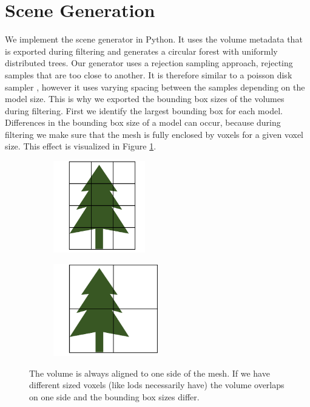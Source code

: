 \section{Scene Generation}
\label{sec:scene_generation}
We implement the scene generator in Python.
It uses the volume metadata that is exported during filtering and generates a circular forest with uniformly distributed trees.
Our generator uses a rejection sampling approach, rejecting samples that are too close to another.
It is therefore similar to a poisson disk sampler \cite{poisson_sampling}, however it uses varying spacing between the samples depending on the model size.
This is why we exported the bounding box sizes of the volumes during filtering.
First we identify the largest bounding box for each model.
Differences in the bounding box size of a model can occur, because during filtering we make sure that the mesh is fully enclosed by voxels for a given voxel size.
This effect is visualized in Figure \ref{fig:bounding_sizes}.
\begin{figure}[ht]
    \centering
    \begin{subfigure}[b]{0.45\linewidth}
        \centering
        \includegraphics[height=4cm]{img/bounding_size_1.png}
    \end{subfigure}
    \begin{subfigure}[b]{0.45\linewidth}
        \centering
        \includegraphics[height=4cm]{img/bounding_size_2.png}
    \end{subfigure}
	\caption[Bounding boxes resulting from different sized voxels]{The volume is always aligned to one side of the mesh. If we have different sized voxels (like \acsp{lod} necessarily have) the volume overlaps on one side and the bounding box sizes differ.}
	\label{fig:bounding_sizes}
\end{figure}
